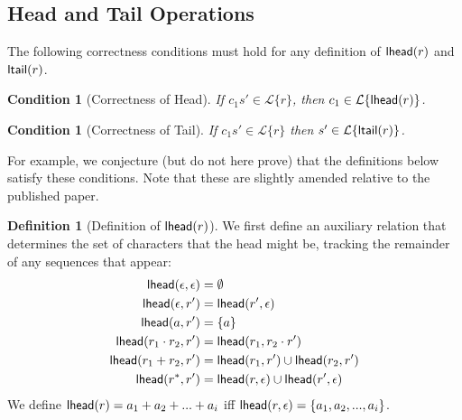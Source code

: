 \documentclass[11pt,leqno]{article}
\newtheorem{trlem}[tr]{Lemma}
\newtheorem{condition}[tr]{Condition}
\theoremstyle{definition}
\newtheorem{defn}[thm]{Definition}
\newcommand{\Lagr}{\mathcal{L}}
\newcommand{\lang}[1]{\Lagr\{#1\}}
\newcommand{\lhead}[1]{ {\sf lhead}(#1) }
\newcommand{\ltail}[1]{ {\sf ltail}(#1) }
\begin{document}
\subsection{Head and Tail Operations}
The following correctness conditions must hold for any definition of $\lhead{r}$ and $\ltail{r}$.


\begin{condition}[Correctness of Head] \label{trlemmax}
If $c_1  s' \in \lang{r}$, then
$c_1 \in \lang{\lhead{r}}$.
\end{condition}

\begin{condition}[Correctness of Tail] \label{trlemma:tail-correctness}
If $c_1 s' \in \lang{r}$ then $s' \in \lang{\ltail{r}}$.
\end{condition}

For example, we conjecture (but do not here prove) that the definitions below satisfy these conditions. Note that these are slightly amended relative to the published paper.

\begin{defn}[Definition of $\lhead{r}$]\label{def:lhead}
We first define an auxiliary relation that determines the set of characters that the head might be, tracking the remainder of any sequences that appear:
\begin{align*}
\lhead{\epsilon, \epsilon} &= \emptyset\\
\lhead{\epsilon, r'}      &= \lhead{r', \epsilon} \\
\lhead{a, r'}             &= \{a\} \\
\lhead{r_1\cdot r_2, r'}  &= \lhead{r_1, r_2 \cdot r'} \\
\lhead{r_1 + r_2, r'}     &= \lhead{r_1, r'} \cup \lhead{r_2, r'} \\
\lhead{r^*, r'}           &= \lhead{r, \epsilon} \cup \lhead{r', \epsilon}
\end{align*}
We define $\lhead{r} = a_1 + a_2 + ... + a_i$ iff $\lhead{r, \epsilon} = \{a_1, a_2, ..., a_i\}$.
\end{defn}



\end{document}
